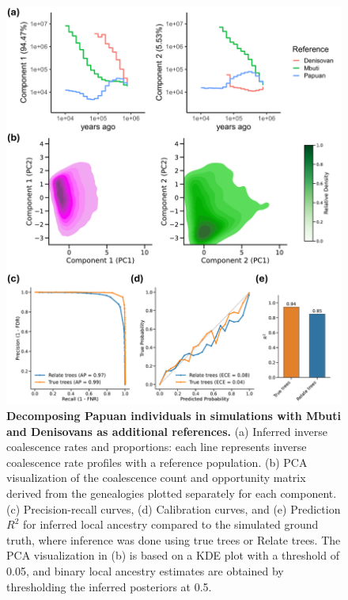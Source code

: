 \begin{figure}[h!]
    \centering
    \includegraphics[width=\linewidth]{figures/gb_sims/thesis_gb_sim_denisovan_relate_ghost.pdf}
    \caption{
    \textbf{Decomposing Papuan individuals in simulations with Mbuti and Denisovans as additional references.} (a) Inferred inverse coalescence rates and proportions: each line represents inverse coalescence rate profiles with a reference population. (b) PCA visualization of the coalescence count and opportunity matrix derived from the genealogies plotted separately for each component. (c) Precision-recall curves, (d) Calibration curves, and (e) Prediction $R^2$ for inferred local ancestry compared to the simulated ground truth, where inference was done using true trees or Relate trees. The PCA visualization in (b) is based on a KDE plot with a threshold of 0.05, and binary local ancestry estimates are obtained by thresholding the inferred posteriors at 0.5.
    }
    \label{fig:enter-label}
\end{figure}


